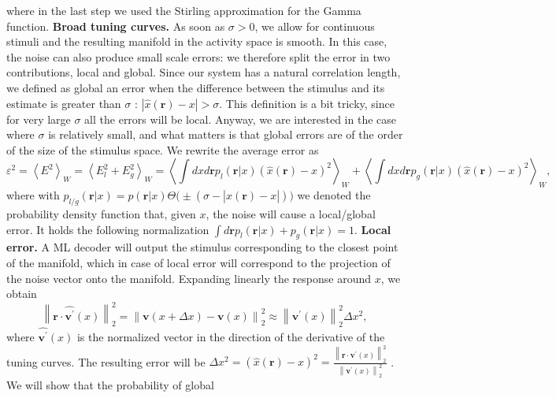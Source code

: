 \documentclass[a4paper]{article}%
\begin{document}
where in the last step we used the Stirling approximation for the Gamma
function.
\newline\newline
\textbf{Broad tuning curves.} As soon as $\sigma>
0$, we allow for continuous stimuli and the resulting manifold in the activity
space is smooth. In this case, the noise can also produce small scale
errors: we therefore split the error in two contributions, local and global.
Since our system has a natural correlation length, we defined as global an
error when the difference between the stimulus and its estimate is greater
than $\sigma$ : $|\hat{x}(\mathbf{r}) - x |> \sigma$. This definition is a bit
tricky, since for very large $\sigma$ all the errors will be local. Anyway, we
are interested in the case where $\sigma$ is relatively small, and what
matters is that global errors are of the order of the size of the stimulus
space. We rewrite the average error as
\begin{equation}
\varepsilon^2 = \left\langle E^{2} \right\rangle_{W}= \left\langle E_{l}^{2} +
E_{g}^{2} \right\rangle_{W}= \left\langle\int dx d\mathbf{r} p_{l}
\left(\mathbf{r}|x\right)\left(\hat{x}(\mathbf{r}) -x \right)^{2}\right\rangle_{W} + \left\langle\int
dx d\mathbf{r}p_{g}(\mathbf{r}|x) \left(\hat{x}(\mathbf{r}) -x \right)^{2}
\right\rangle_{W},
\end{equation}
where with $p_{l/g}(\mathbf{r}|x) = p(\mathbf{r}|x) \Theta\big(\pm(\sigma-
|\hat{x}(\mathbf{r})-x|)\big)$ we denoted the probability density function
that, given $x$, the noise will cause a local/global error. It holds the
following normalization $\int d\mathbf{r} p_{l}(\mathbf{r}|x) + p_{g}
(\mathbf{r}|x)=1$. 
\newline\newline
\textbf{Local error.} A ML decoder will
output the stimulus corresponding to the closest point of the manifold, which
in case of local error will correspond to the projection of the noise vector
onto the manifold. Expanding linearly the response around $x$, we obtain
\begin{equation}
\left\|  \mathbf{r}\cdot\hat{\mathbf{v^{\prime}}}(x)\right\| _{2}^{2}
=\left\|  \mathbf{v}(x+\Delta x)-\mathbf{v}(x)\right\| _{2}^{2} \approx\left\|
\mathbf{v^{\prime}}(x)\right\| _{2}^{2}\Delta x^{2},
\end{equation}
where $\hat{\mathbf{v^{\prime}}}(x)$ is the normalized vector in the direction
of the derivative of the tuning curves. The resulting error will be $\Delta x^{2} = \left(\hat
{x}(\mathbf{r})-x\right)^{2} = \frac{\left\|  \mathbf{r}\cdot\hat
{\mathbf{v^{\prime}}}(x)\right\| _{2}^{2}}{\left\| \mathbf{v^{\prime}
}(x)\right\| _{2}^{2}}$ . We will show that the probability of global
\end{document}
